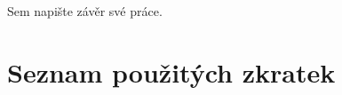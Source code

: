 \documentclass[thesis=B,czech,hidelinks]{src/FITthesisXE}
\begin{document}
\begin{introduction}
\label{introduction}
	
\end{introduction}

\begin{conclusion}
\label{conclusion}
	Sem napište závěr své práce.
\end{conclusion}

\printbibliography[title={Zdroje}]

\appendix

\chapter{Seznam použitých zkratek}
\printglossary[type=\acronymtype,style=acronyms]


\end{document}
